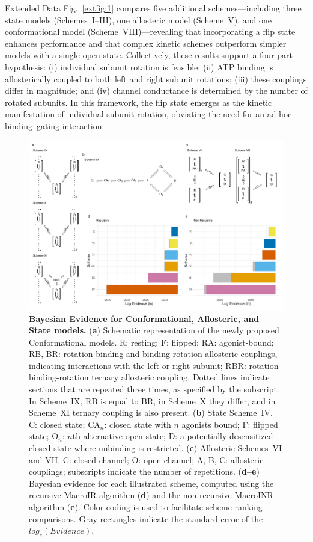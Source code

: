 \documentclass[pdflatex,sn-nature]{sn-jnl}%
\theoremstyle{thmstyleone}%
\theoremstyle{thmstyletwo}%
\theoremstyle{thmstylethree}%
\begin{document}
Extended Data Fig.~\ref{extfig:1} compares five additional schemes—including three state models (Schemes~I–III), one allosteric model (Scheme~V), and one conformational model (Scheme~VIII)—revealing that incorporating a flip state enhances performance and that complex kinetic schemes outperform simpler models with a single open state. Collectively, these results support a four-part hypothesis: (i) individual subunit rotation is feasible; (ii) ATP binding is allosterically coupled to both left and right subunit rotations; (iii) these couplings differ in magnitude; and (iv) channel conductance is determined by the number of rotated subunits. In this framework, the flip state emerges as the kinetic manifestation of individual subunit rotation, obviating the need for an ad hoc binding–gating interaction.
\begin{figure}[t]
	\centering
	\includegraphics[width=\linewidth]{Figure_1.pdf}
	\caption{\textbf{Bayesian Evidence for Conformational, Allosteric, and State models.}  
		(\textbf{a}) Schematic representation of the newly proposed Conformational models. R: resting; F: flipped; RA: agonist-bound; RB, BR: rotation-binding and binding-rotation allosteric couplings, indicating interactions with the left or right subunit; RBR: rotation-binding-rotation ternary allosteric coupling. Dotted lines indicate sections that are repeated three times, as specified by the subscript. In Scheme~IX, RB is equal to BR, in Scheme~X they differ, and in Scheme~XI ternary coupling is also present.  
		(\textbf{b}) State Scheme~IV. C: closed state; CA$_n$: closed state with $n$ agonists bound; F: flipped state; O$_n$: $n$th alternative open state; D: a potentially desensitized closed state where unbinding is restricted.  
		(\textbf{c}) Allosteric Schemes~VI and VII. C: closed channel; O: open channel; A, B, C: allosteric couplings; subscripts indicate the number of repetitions.  
		(\textbf{d--e}) Bayesian evidence for each illustrated scheme, computed using the recursive MacroIR algorithm (\textbf{d}) and the non-recursive MacroINR algorithm (\textbf{e}). Color coding is used to facilitate scheme ranking comparisons. Gray rectangles indicate the standard error of the $log_e(Evidence)$.  
	}
	\label{fig:figure1}
\end{figure}
\end{document}
